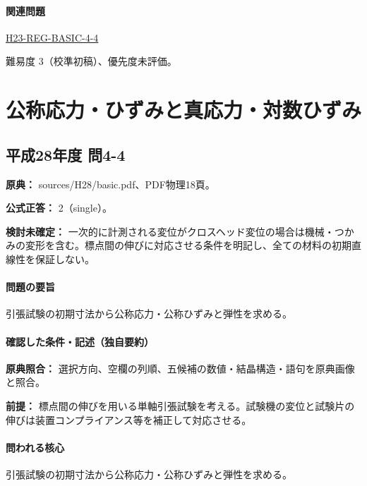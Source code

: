 \paragraph{関連問題} \hyperref[q:h23-reg-basic-4-4]{H23-REG-BASIC-4-4}

\par 難易度 3（校準初稿）、優先度未評価。

\section{公称応力・ひずみと真応力・対数ひずみ}

\subsection{平成28年度 問4-4}
\label{q:h28-reg-basic-4-4}

\noindent\textbf{原典：} sources/H28/basic.pdf、PDF物理18頁。

\textbf{公式正答：} 2（single）。

\par\textbf{検討未確定：} 一次的に計測される変位がクロスヘッド変位の場合は機械・つかみの変形を含む。標点間の伸びに対応させる条件を明記し、全ての材料の初期直線性を保証しない。

\paragraph{問題の要旨} 引張試験の初期寸法から公称応力・公称ひずみと弾性を求める。

\paragraph{確認した条件・記述（独自要約）}\mbox{}\par

\noindent\textbf{原典照合：} 選択方向、空欄の列順、五候補の数値・結晶構造・語句を原典画像と照合。\par

\noindent\textbf{前提：} 標点間の伸びを用いる単軸引張試験を考える。試験機の変位と試験片の伸びは装置コンプライアンス等を補正して対応させる。\par

\paragraph{問われる核心} 引張試験の初期寸法から公称応力・公称ひずみと弾性を求める。

